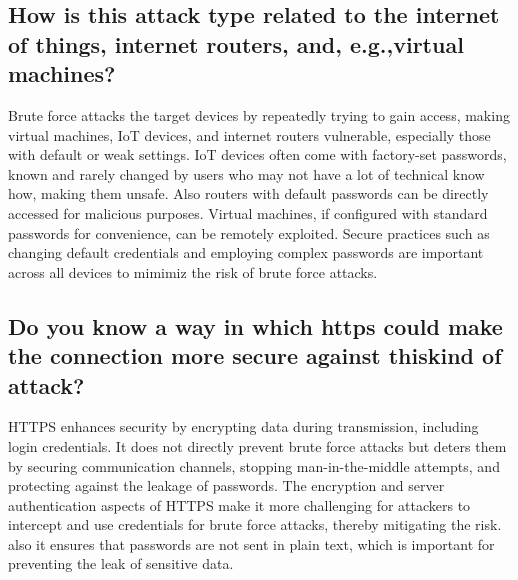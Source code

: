 \subsection{How is this attack type related to the internet of things, internet routers, and, e.g.,virtual machines?}
Brute force attacks the target devices by repeatedly trying to gain access, making virtual machines, IoT devices, and internet routers vulnerable,
especially those with default or weak settings. IoT devices often come with factory-set passwords, known and rarely changed by users who may not have a lot of technical know how,
making them unsafe. Also routers with default passwords can be directly accessed for malicious purposes.
Virtual machines, if configured with standard passwords for convenience,
can be remotely exploited. Secure practices such as changing default credentials and employing complex passwords are important across all devices to
mimimiz the risk of brute force attacks.

\subsection{Do you know a way in which https could make the connection more secure against thiskind of attack?}
HTTPS enhances security by encrypting data during transmission, including login credentials.
It does not directly prevent brute force attacks but deters them by securing communication channels, stopping man-in-the-middle attempts,
and protecting against the leakage of passwords.
The encryption and server authentication aspects of HTTPS make it more challenging for attackers to intercept and use credentials for brute force attacks,
thereby mitigating the risk. also it ensures that passwords are not sent in plain text, which is important for preventing the leak of sensitive data.
